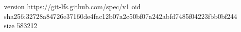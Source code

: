 version https://git-lfs.github.com/spec/v1
oid sha256:32728a84726e37160de4fac12b07a2c50bf07a242abfd7485f04223fbb0bf244
size 583212
